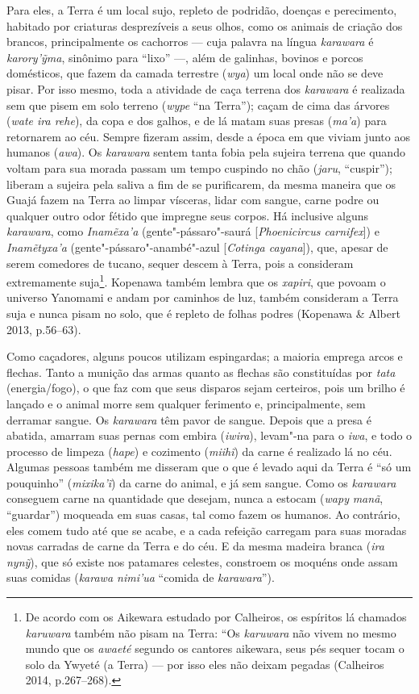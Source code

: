 Para eles, a Terra é um local sujo, repleto de podridão, doenças e
perecimento, habitado por criaturas desprezíveis a seus olhos, como os
animais de criação dos brancos, principalmente os cachorros --- cuja
palavra na língua \emph{karawara} é \emph{karory'ỹma}, sinônimo para
``lixo'' ---, além de galinhas, bovinos e porcos domésticos, que fazem da
camada terrestre (\emph{wya}) um local onde não se deve pisar. Por isso
mesmo, toda a atividade de caça terrena dos \emph{karawara} é realizada
sem que pisem em solo terreno (\emph{wype} ``na Terra''); caçam de cima
das árvores (\emph{wate ira rehe}), da copa e dos galhos, e de lá matam
suas presas (\emph{ma'a}) para retornarem ao céu. Sempre fizeram assim,
desde a época em que viviam junto aos humanos (\emph{awa}). Os
\emph{karawara} sentem tanta fobia pela sujeira terrena que quando
voltam para sua morada passam um tempo cuspindo no chão (\emph{jaru},
``cuspir''); liberam a sujeira pela saliva a fim de se purificarem, da
mesma maneira que os Guajá fazem na Terra ao limpar vísceras, lidar com
sangue, carne podre ou qualquer outro odor fétido que impregne seus
corpos. Há inclusive alguns \emph{karawara}, como \emph{Inamẽxa'a}
(gente"-pássaro"-saurá {[}\emph{Phoenicircus carnifex}{]}) e
\emph{Inamẽtyxa'a} (gente"-pássaro"-anambé"-azul {[}\emph{Cotinga
cayana}{]}), que, apesar de serem comedores de tucano, sequer descem à
Terra, pois a consideram extremamente suja\footnote{De acordo com os
  Aikewara estudado por Calheiros, os espíritos lá chamados
  \emph{karuwara} também não pisam na Terra: ``Os \emph{karuwara} não
  vivem no mesmo mundo que os \emph{awaeté} segundo os cantores
  aikewara, seus pés sequer tocam o solo da Ywyeté (a Terra) --- por isso
  eles não deixam pegadas (Calheiros 2014, p.267--268).}. Kopenawa também
lembra que os \emph{xapiri}, que povoam o universo Yanomami e andam por
caminhos de luz, também consideram a Terra suja e nunca pisam no solo,
que é repleto de folhas podres (Kopenawa \& Albert 2013, p.56--63).

Como caçadores, alguns poucos utilizam espingardas; a maioria emprega
arcos e flechas. Tanto a munição das armas quanto as flechas são
constituídas por \emph{tata} (energia/fogo), o que faz com que seus
disparos sejam certeiros, pois um brilho é lançado e o animal morre sem
qualquer ferimento e, principalmente, sem derramar sangue. Os
\emph{karawara} têm pavor de sangue. Depois que a presa é abatida,
amarram suas pernas com embira (\emph{iwira}), levam"-na para o
\emph{iwa}, e todo o processo de limpeza (\emph{hape}) e cozimento
(\emph{miihĩ}) da carne é realizado lá no céu. Algumas pessoas também me
disseram que o que é levado aqui da Terra é ``só um pouquinho''
(\emph{mixika'ĩ}) da carne do animal, e já sem sangue. Como os
\emph{karawara} conseguem carne na quantidade que desejam, nunca a
estocam (\emph{wapy} \emph{manã}, ``guardar'') moqueada em suas casas, tal
como fazem os humanos. Ao contrário, eles comem tudo até que se acabe, e
a cada refeição carregam para suas moradas novas carradas de carne da
Terra e do céu. E da mesma madeira branca (\emph{ira} \emph{nynỹ}), que
só existe nos patamares celestes, constroem os moquéns onde assam suas
comidas (\emph{karawa nimi'ua} ``comida de \emph{karawara}'').


